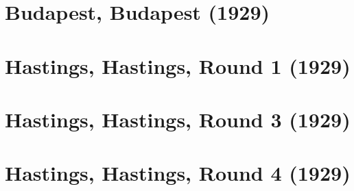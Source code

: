 \documentclass[11pt]{article}
\begin{document}
\section{Budapest, Budapest (1929)}


\clearpage



\clearpage



\clearpage



\clearpage



\clearpage



\clearpage



\clearpage



\clearpage



\clearpage



\clearpage



\clearpage



\clearpage



\clearpage

\section{Hastings, Hastings, Round 1 (1929)}


\clearpage

\section{Hastings, Hastings, Round 3 (1929)}


\clearpage

\section{Hastings, Hastings, Round 4 (1929)}

\end{document}
